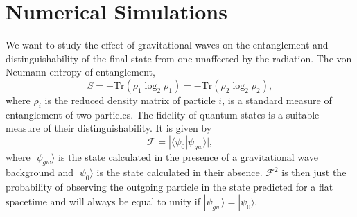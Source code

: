 \section{Numerical Simulations}\label{sec:numerical}

We want to study the effect of gravitational waves on the entanglement
and distinguishability of the final state from one unaffected by the
radiation. The von Neumann entropy of entanglement,
\begin{equation}
S = -\text{Tr}(\rho_1 \log_2 \rho_1) = -\text{Tr}(\rho_2 \log_2
\rho_2),
\end{equation}
where $\rho_i$ is the reduced density matrix of particle $i$, is a
standard measure of entanglement of two particles. The fidelity of
quantum states is a suitable measure of their distinguishability. It
is given by
\begin{equation}
\mathcal{F} = | \langle \psi_0 | \psi_{gw} \rangle |,
\end{equation}
where $| \psi_{gw} \rangle$ is the state calculated in the presence of
a gravitational wave background and $| \psi_0 \rangle$ is the state
calculated in their absence. $\mathcal{F}^2$ is then just the
probability of observing the outgoing particle in the state predicted
for a flat spacetime and will always be equal to unity if $| \psi_{gw}
\rangle = | \psi_0 \rangle $.

